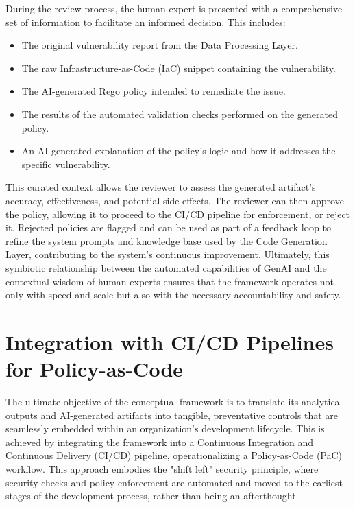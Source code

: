 During the review process, the human expert is presented with a comprehensive set of information to facilitate an informed decision. This includes:

\begin{itemize}
    \item The original vulnerability report from the Data Processing Layer.
    \item The raw Infrastructure-as-Code (IaC) snippet containing the vulnerability.
    \item The AI-generated Rego policy intended to remediate the issue.
    \item The results of the automated validation checks performed on the generated policy.
    \item An AI-generated explanation of the policy's logic and how it addresses the specific vulnerability.
\end{itemize}

This curated context allows the reviewer to assess the generated artifact's accuracy, effectiveness, and potential side effects. The reviewer can then approve the policy, allowing it to proceed to the CI/CD pipeline for enforcement, or reject it. Rejected policies are flagged and can be used as part of a feedback loop to refine the system prompts and knowledge base used by the Code Generation Layer, contributing to the system's continuous improvement\cite{zanzotto_human---loop_2019, wu_survey_2022}. Ultimately, this symbiotic relationship between the automated capabilities of GenAI and the contextual wisdom of human experts ensures that the framework operates not only with speed and scale but also with the necessary accountability and safety.


\section{Integration with CI/CD Pipelines for Policy-as-Code} %
\label{sec:Integration with CI/CD Pipelines for Policy-as-Code}

The ultimate objective of the conceptual framework is to translate its analytical outputs and AI-generated artifacts into tangible, preventative controls that are seamlessly embedded within an organization's development lifecycle. This is achieved by integrating the framework into a Continuous Integration and Continuous Delivery (CI/CD) pipeline, operationalizing a Policy-as-Code (PaC) workflow. This approach embodies the "shift left" security principle, where security checks and policy enforcement are automated and moved to the earliest stages of the development process, rather than being an afterthought.

